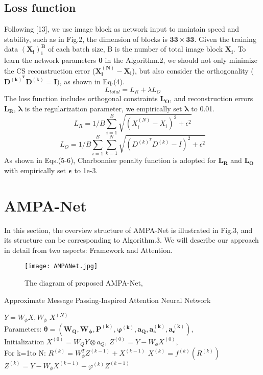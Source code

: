 \documentclass[conference]{IEEEtran}
\begin{document}
\subsection{Loss function}
Following [13], we use image block as network input to maintain speed and stability, such as in Fig.2, the dimension of blocks is $\bm{33\times33}$. Given the training data $\bm{(X_i)_i^B}$ of each batch size, B is the number of total image block  $\bm{X_i}$. To learn the network parameters $\bm{\theta}$ in the Algorithm.2, we should not only minimize the CS reconstruction error ($\bm{X_i^{(N)}-X_i}$), but also consider the orthogonality ($\bm{D^{(k)^T}D^{(k)}=I)}$, as shown in Eq.(4).
\begin{equation}
L_{total}= L_R+\lambda L_O  
\end{equation}
The loss function includes orthogonal constraints $\bm{L_O}$, and reconstruction errors $\bm{L_R}$, $\bm{\lambda}$ is the regularization parameter, we empirically set $\bm{\lambda}$  to 0.01.
\begin{equation}
 L_R=1/B \sum_{i=1}^B \sqrt{(X_i^{(N)}-X_i)^2+\epsilon^2}
\end{equation}
\begin{equation}
 L_O= 1/B\sum_{i=1}^B\sum_{k=1}^N\sqrt{(D^{(k)^T}D^{(k)}-I)^2+\epsilon^2}
\end{equation}
As shown in Eqs.(5-6), Charbonnier penalty function is adopted for $\bm{L_R}$ and $\bm{L_O}$ with empirically set $\bm{\epsilon}$ to 1e-3.
\section{AMPA-Net}
In this section, the overview structure of AMPA-Net is illustrated in Fig.3, and its structure can be corresponding to Algorithm.3. We will describe our approach in detail from two aspects: Framework and  Attention.
\begin{figure*}[t]
\centering
\texttt{[image: AMPANet.jpg]} \caption{The diagram of proposed AMPA-Net,}
\label{fig:AMPANet} \end{figure*}

\begin{algorithm}
\caption{Approximate Message Passing-Inspired Attention Neural Network}
\label{alg:Approximate Message Passing-Inspired Attention Neural Network}
\begin{algorithmic}
\REQUIRE $Y= W_\phi X, W_\phi$
\ENSURE $X^{(N)}$
\\Parameters: $\bm{\theta=(W_Q,W_\phi,P^{(k)}, \varphi^{(k)},a_Q , a_s^{(k)}, a_c^{(k)})}$, 
\\Initialization
\STATE $X^{(0)}=W_QY\otimes a_Q$, 
\STATE $Z^{(0)}=Y-W_\phi X^{(0)}$,
\\For k=1to N:
       \STATE $  R^{(k)}=W_\phi^T Z^{(k-1)}+X^{(k-1)}$
       \STATE $  X^{(k)}=f^{(k)} ( R^{(k)})$
        \STATE $  Z^{(k)}=Y- W_\phi X^{(k-1)}+  \varphi^{(k)} Z^{(k-1) }$
\end{algorithmic}
\end{algorithm}
\end{document}
